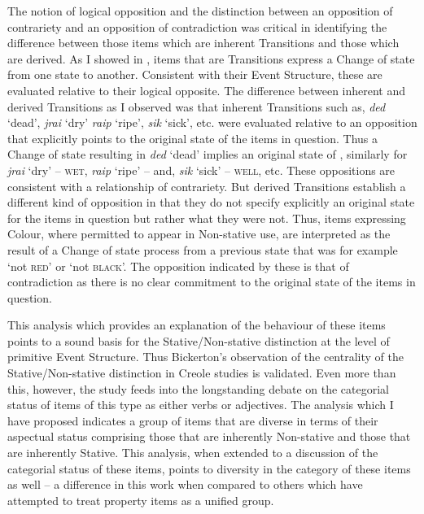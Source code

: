 The notion of logical opposition and the distinction between an opposition of contrariety and an opposition of contradiction was critical in identifying the difference between those items which are inherent Transitions and those which are derived. As I showed in , items that are Transitions express a Change of state from one state to another. Consistent with their Event Structure, these are evaluated relative to their logical opposite. The difference between inherent and derived Transitions as I observed was that inherent Transitions such as, \textit{ded} `dead', \textit{jrai} `dry' \textit{raip} `ripe', \textit{sik} `sick', etc. were evaluated relative to an opposition that explicitly points to the original state of the items in question. Thus a Change of state resulting in \textit{ded} `dead' implies an original state of \ALIVE, similarly for \textit{jrai} `dry' -- \textsc{wet}, \textit{raip} `ripe' -- \GREEN and, \textit{sik} `sick' -- \textsc{well}, etc. These oppositions are consistent with a relationship of contrariety. But derived Transitions establish a different kind of opposition in that they do not specify explicitly an original state for the items in question but rather what they were not. Thus, items expressing Colour, where permitted to appear in Non-stative use, are interpreted as the result of a Change of state process from a previous state that was for example `not \textsc{red}' or `not \textsc{black}'. The opposition indicated by these is that of contradiction as there is no clear commitment to the original state of the items in question. 

This analysis which provides an explanation of the behaviour of these items points to a sound basis for the Stative\slash Non-stative distinction at the level of primitive Event Structure. Thus Bickerton’s observation of the centrality of the Stative\slash Non-stative distinction in Creole studies is validated. Even more than this, however, the study feeds into the longstanding debate on the categorial status of items of this type as either verbs or adjectives. The analysis which I have proposed indicates a group of items that are diverse in terms of their aspectual status comprising those that are inherently Non-stative and those that are inherently Stative. This analysis, when extended to a discussion of the categorial status of these items, points to diversity in the category of these items as well -- a difference in this work when compared to others which have attempted to treat property items as a unified group. 

